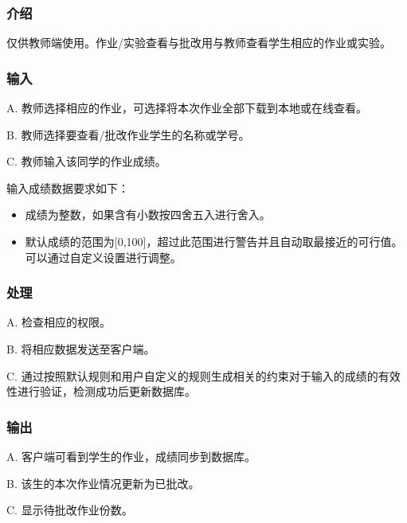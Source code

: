      \subsubsection{介绍}
	 仅供教师端使用。作业/实验查看与批改用与教师查看学生相应的作业或实验。
	 \subsubsection{输入}
	 A. 教师选择相应的作业，可选择将本次作业全部下载到本地或在线查看。

	 B. 教师选择要查看/批改作业学生的名称或学号。

	 C. 教师输入该同学的作业成绩。

	 输入成绩数据要求如下：
      \begin{itemize}
       \item 成绩为整数，如果含有小数按四舍五入进行舍入。
       \item 默认成绩的范围为[0,100]，超过此范围进行警告并且自动取最接近的可行值。可以通过自定义设置进行调整。
     \end{itemize}
	\subsubsection{处理}
	 A. 检查相应的权限。

	 B. 将相应数据发送至客户端。

	 C. 通过按照默认规则和用户自定义的规则生成相关的约束对于输入的成绩的有效性进行验证，检测成功后更新数据库。

	\subsubsection{输出}
	A. 客户端可看到学生的作业，成绩同步到数据库。

	B. 该生的本次作业情况更新为已批改。

	C. 显示待批改作业份数。











